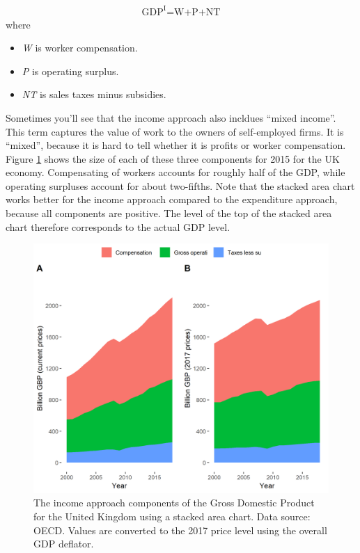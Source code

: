 \documentclass[]{book}
\providecommand{\tightlist}{%
  \setlength{\itemsep}{0pt}\setlength{\parskip}{0pt}}
\begin{document}
\begin{align}
   \text{GDP}^{\text{I}} \text{=W+P+NT}
\end{align}
where

\begin{itemize}
\tightlist
\item
  \emph{W} is worker compensation.
\item
  \emph{P} is operating surplus.
\item
  \emph{NT} is sales taxes minus subsidies.
\end{itemize}

Sometimes you'll see that the income approach also incldues ``mixed income''. This term captures the value of work to the owners of self-employed firms. It is ``mixed'', because it is hard to tell whether it is profits or worker compensation. Figure \ref{fig:gdp6} shows the size of each of these three components for 2015 for the UK economy. Compensating of workers accounts for roughly half of the GDP, while operating surpluses account for about two-fifths. Note that the stacked area chart works better for the income approach compared to the expenditure approach, because all components are positive. The level of the top of the stacked area chart therefore corresponds to the actual GDP level.

\begin{figure}

{\centering \includegraphics[width=0.9\linewidth]{_resources/chapter_gdp/fig4} 

}

\caption{The income approach components of the Gross Domestic Product for the United Kingdom using a stacked area chart. Data source: OECD. Values are converted to the 2017 price level using the overall GDP deflator.}\label{fig:gdp6}
\end{figure}
\end{document}
